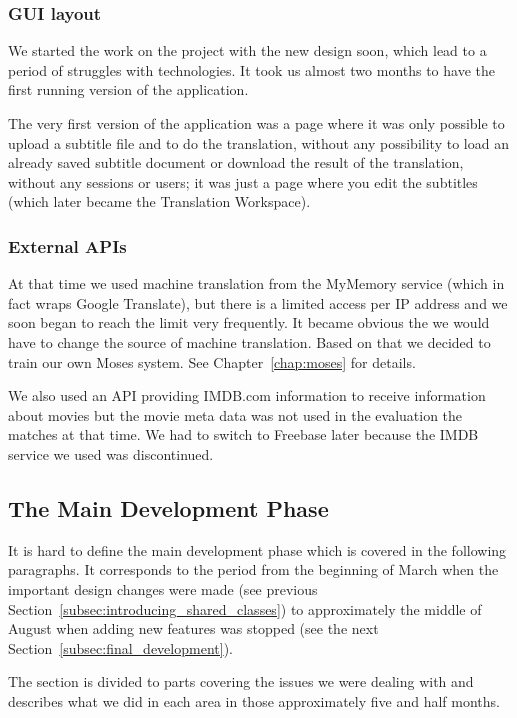 \subsubsection{GUI layout}

We started the work on the project with the new design soon, which lead to a period of struggles with technologies. It took us almost two months to have the first running version of the application.

The very first version of the application was a page where it was only possible to upload a subtitle file and to do the translation, without any possibility to load an already saved subtitle document or download the result of the translation, without any sessions or users; it was just a page where you edit the subtitles (which later became the Translation Workspace).


\subsubsection{External APIs}

At that time we used machine translation from the MyMemory service (which in fact wraps Google Translate), but there is a limited access per IP address and we soon began to reach the limit very frequently. It became obvious the we would have to change the source of machine translation. Based on that we decided to train our own Moses system. See Chapter~\ref{chap:moses} for details.

We also used an API providing IMDB.com information to receive information 
about movies but the movie meta data was not used in the evaluation the 
matches at that time. We had to switch to Freebase later because the IMDB service we used was discontinued.

\subsection{The Main Development Phase}

It is hard to define the main development phase which is covered in the 
following paragraphs. It corresponds to the period from the beginning of 
March when the important design changes were made (see previous 
Section~\ref{subsec:introducing_shared_classes}) to approximately the 
middle of August when adding new features was stopped (see the next 
Section~\ref{subsec:final_development}).

The section is divided to parts covering the issues we were dealing with 
and describes what we did in each area in those approximately five and 
half months.

